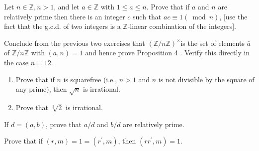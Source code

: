\begin{questions}
\begin{solution}
\end{solution}


\question
    Let \(n \in \mathbb{Z}, n>1\), and let \(a \in \mathbb{Z}\) with \(1 \leq a \leq n\). Prove that if \(a\) and \(n\) are relatively prime then there is an integer \(c\) such that \(a c \equiv 1(\bmod n)\), [use the fact that the g.c.d. of two integers is a \(\mathbb{Z}\)-linear combination of the integers].



\begin{solution}
    
\end{solution}


\question
    Conclude from the previous two exercises that \((\mathbb{Z} / n \mathbb{Z})^{\times}\)is the set of elements \(\bar{a}\) of \(\mathbb{Z} / n \mathbb{Z}\) with \((a, n)=1\) and hence prove Proposition 4 . Verify this directly in the case \(n=12\).




\begin{solution}
    
\end{solution}


\question
    \begin{enumerate}[label=(\alph*)]
        \item Prove that if \(n\) is squarefree (i.e., \(n>1\) and \(n\) is not divisible by the square of any prime), then \(\sqrt{n}\) is irrational.
        \item Prove that \(\sqrt[3]{2}\) is irrational.
    \end{enumerate}


\begin{solution}
    
\end{solution}


\question
    If \(d=(a, b)\), prove that \(a / d\) and \(b / d\) are relatively prime.


\begin{solution}
    
\end{solution}


\question
    Prove that if \((r, m)=1=\left(r^{\prime}, m\right)\), then \(\left(r r^{\prime}, m\right)=1\).


\begin{solution}
    

\end{solution}
\end{questions}
